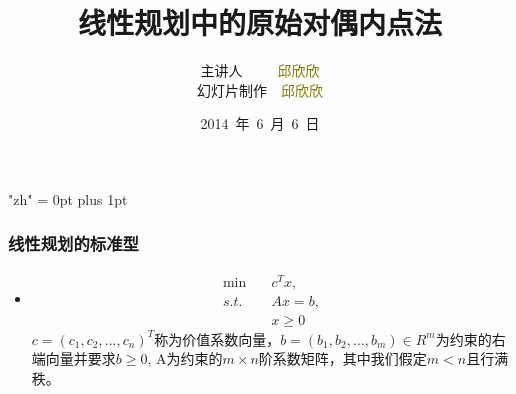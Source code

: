 \documentclass[notheorems,mathserif,table,compress]{beamer}  %
\begin{document}
\XeTeXlinebreaklocale "zh"         %
\XeTeXlinebreakskip = 0pt plus 1pt %


\title{线性规划中的原始对偶内点法}
\author[qiu]{主讲人~~~~~\textcolor{olive}{邱欣欣}\\
    \quad 幻灯片制作~~\textcolor{olive}{邱欣欣}}
\institute[中国海洋大学]{\small\textcolor{violet}{中国海洋大学~~信息科学与工程学院}}
\date{2014~年~6~月~6~日}
\frame{ \titlepage }

%
\begin{frame}
\frametitle{线性规划的标准型}
\begin{itemize}
\item 
\begin{equation}
\begin{split}
\min \quad&c^{T}x,\\
s.t.  \quad&Ax=b,\\
&x\geq0
\end{split}
\end{equation}
$c=(c_1,c_2,\dots,c_n)^{T}$称为价值系数向量，$b=(b_1,b_2,\dots,b_m)\in {R^m}$为约束的右端向量并要求$b\geq0$, A为约束的$m\times n$阶系数矩阵，其中我们假定$m<n$且行满秩。
\end{itemize}
\end{frame}
\end{document}
